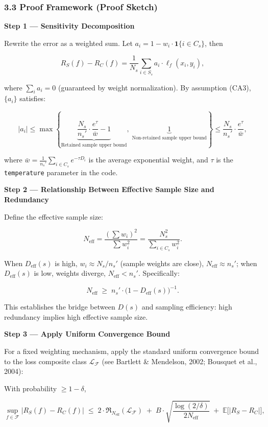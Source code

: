 \documentclass[
  12pt,
]{article}
\begin{document}
\subsubsection{3.3 Proof Framework (Proof Sketch)}\label{proof-sketch}

\textbf{Step 1 --- Sensitivity Decomposition}

Rewrite the error as a weighted sum. Let
\(a_i = 1 - w_i \cdot \mathbf{1}\{i \in C_s\}\), then

\[
R_S(f) - R_C(f) = \frac{1}{N_s} \sum_{i \in S_s} a_i \cdot \ell_f(x_i, y_i),
\]

where \(\sum_i a_i = 0\) (guaranteed by weight normalization). By assumption (CA3), \(\{a_i\}\)
satisfies:

\[
|a_i| \leq \max\!\left\{
\underbrace{\frac{N_s}{n_s'} \cdot \frac{e^{\tau}}{\bar{w}} - 1}_{\text{Retained sample upper bound}},
\; \underbrace{1}_{\text{Non-retained sample upper bound}}
\right\}
\leq \frac{N_s}{n_s'} \cdot \frac{e^{\tau}}{\bar{w}},
\]

where \(\bar{w} = \frac{1}{n_s'} \sum_{i \in C_s} e^{-\tau D_i}\)
is the average exponential weight, and \(\tau\) is the \texttt{temperature} parameter in the code.

\textbf{Step 2 --- Relationship Between Effective Sample Size and Redundancy}

Define the effective sample size:

\[
N_{\text{eff}} = \frac{(\sum w_i)^2}{\sum w_i^2} = \frac{N_s^2}{\sum_{i \in C_s} w_i^2}.
\]

When \(D_{\text{eff}}(s)\)
is high, \(w_i \approx N_s/n_s'\) (sample weights are close), \(N_{\text{eff}} \approx n_s'\); when
\(D_{\text{eff}}(s)\)
is low, weights diverge, \(N_{\text{eff}} < n_s'\). Specifically:

\[
N_{\text{eff}} \;\geq\; n_s' \cdot \bigl(1 - D_{\text{eff}}(s)\bigr)^{-1}.
\tag{8}
\]

This establishes the bridge between \(D(s)\) and sampling efficiency: high redundancy implies high effective sample size.

\textbf{Step 3 --- Apply Uniform Convergence Bound}

For a fixed weighting mechanism, apply the standard
uniform convergence bound to the loss composite class \(\mathcal{L}_{\mathcal{F}}\) (see Bartlett \& Mendelson, 2002; Bousquet et al., 2004):

With probability \(\geq 1 - \delta\),

\[
\sup_{f \in \mathcal{F}} \bigl| R_S(f) - R_C(f) \bigr|
\;\leq\; 2 \cdot \mathfrak{R}_{N_{\text{eff}}}(\mathcal{L}_{\mathcal{F}})
\;+\; B \cdot \sqrt{\frac{\log(2/\delta)}{2 N_{\text{eff}}}}
\;+\; \mathbb{E}\bigl[|R_S - R_C|\bigr],
\]
\end{document}
